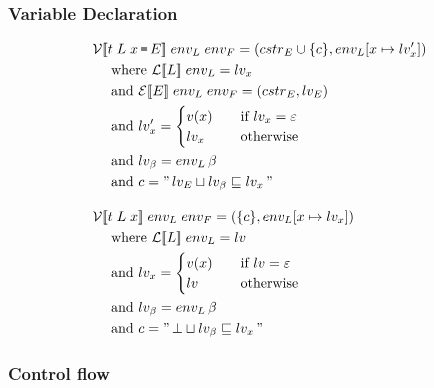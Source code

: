 \subsubsection{Variable Declaration}
\begin{align*}
  & \iV\dblSq{t \; L \; x \tk = E} \; \ienvL \; \ienvF = (\icstr_E \cup \{ c \}, \ienvL[x \mapsto \ilv_x']) \\
  & \dsWhere{\iL\dblSq{L} \; \ienvL = \ilv_x} \\
  & \dsAnd{\iE\dblSq{E} \; \ienvL \; \ienvF = (\icstr_E, \ilv_E)} \\
  & \dsAnd{\ilv_x' = \begin{cases}
  v(x) & \quad \text{if } \ilv_x = \varepsilon \\
  \ilv_x & \quad \text{otherwise}
  \end{cases}} \\
  & \dsAnd{\ilv_\ib = \ienvL \, \ib} \\
  & \dsAnd{c = \literal{\ilv_E \sqcup \ilv_\ib \sqsubseteq \ilv_x}} \rspace
  & \iV\dblSq{t \; L \; x} \; \ienvL \; \ienvF = (\{ c \}, \ienvL[x \mapsto \ilv_x])\\
  & \dsWhere{\iL\dblSq{L} \; \ienvL = \ilv} \\
  & \dsAnd{\ilv_x = \begin{cases}
  v(x) & \quad \text{if } \ilv = \varepsilon \\
  \ilv & \quad \text{otherwise}
  \end{cases}} \\
  & \dsAnd{\ilv_\ib = \ienvL \, \ib} \\
  & \dsAnd{c = \literal{\bot \sqcup \ilv_\ib \sqsubseteq \ilv_x}}
\end{align*}

\subsubsection{Control flow}

